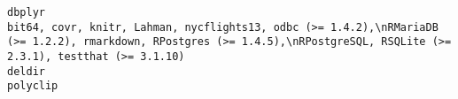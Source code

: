 \documentclass[
  letterpaper,
  DIV=11,
  numbers=noendperiod]{scrreprt}
\begin{document}
\begin{verbatim}
dbplyr                                                                                                                                                                                                                                                                                                                                                                                                                                                                                                                                                                                                                                                                                                                                                                                                                                                                                                                                                                                                                                                                                                                               bit64, covr, knitr, Lahman, nycflights13, odbc (>= 1.4.2),\nRMariaDB (>= 1.2.2), rmarkdown, RPostgres (>= 1.4.5),\nRPostgreSQL, RSQLite (>= 2.3.1), testthat (>= 3.1.10)
deldir                                                                                                                                                                                                                                                                                                                                                                                                                                                                                                                                                                                                                                                                                                                                                                                                                                                                                                                                                                                                                                                                                                                                                                                                                                                                                               polyclip

\end{verbatim}
\end{document}
